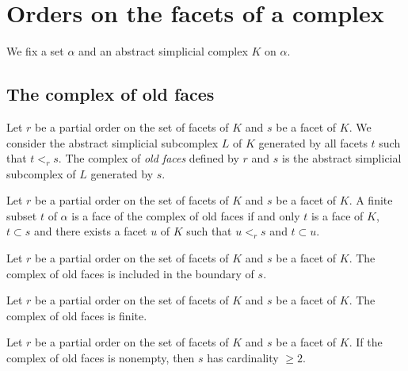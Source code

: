 \section{Orders on the facets of a complex}

We fix a set $\alpha$ and an abstract simplicial complex $K$ on $\alpha$.

\subsection{The complex of old faces}

\begin{subdefi}[OldFaces]
Let $r$ be a partial order on the set of facets of $K$ and $s$ be a facet of $K$. We consider the abstract simplicial subcomplex
$L$ of $K$ generated by all facets $t$ such that $t<_r s$. The complex of \emph{old faces} defined by $r$ and $s$
is the abstract simplicial subcomplex of $L$ generated by $s$.

\end{subdefi}

\begin{sublemma}
Let $r$ be a partial order on the set of facets of $K$ and $s$ be a facet of $K$. A finite subset $t$ of $\alpha$ is a face of
the complex of old faces if and only $t$ is a face of $K$, $t\subset s$ and there exists a facet $u$ of $K$ such that $u<_r s$ and
$t\subset u$.

\end{sublemma}

\begin{sublemma}
Let $r$ be a partial order on the set of facets of $K$ and $s$ be a facet of $K$. The complex of old faces is included in the
boundary of $s$.

\end{sublemma}

\begin{sublemma}[OldFacesFinite]
Let $r$ be a partial order on the set of facets of $K$ and $s$ be a facet of $K$. The complex of old faces is finite.

\end{sublemma}

\begin{sublemma}
Let $r$ be a partial order on the set of facets of $K$ and $s$ be a facet of $K$. If the complex of old faces is nonempty,
then $s$ has cardinality $\geq 2$.

\end{sublemma}


